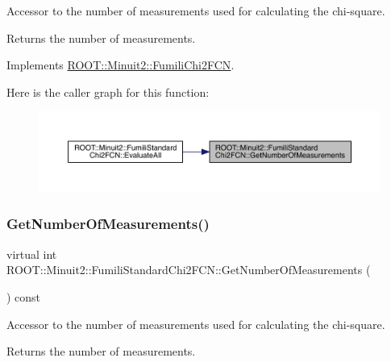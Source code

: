 Accessor to the number of measurements used for calculating the chi-\/square.

\begin{DoxyReturn}{Returns}
the number of measurements. 
\end{DoxyReturn}


Implements \mbox{\hyperlink{classROOT_1_1Minuit2_1_1FumiliChi2FCN_afa1acb8484d1c1825de0dd641e301717}{R\+O\+O\+T\+::\+Minuit2\+::\+Fumili\+Chi2\+F\+CN}}.

Here is the caller graph for this function\+:
\nopagebreak
\begin{figure}[H]
\begin{center}
\leavevmode
\includegraphics[width=350pt]{d8/db2/classROOT_1_1Minuit2_1_1FumiliStandardChi2FCN_a27414beb35c9c18156e6b3781aaf587f_icgraph}
\end{center}
\end{figure}
\mbox{\label{classROOT_1_1Minuit2_1_1FumiliStandardChi2FCN_a868b7c1aa7d2597db475ca99799c9131}} 
\subsubsection{\texorpdfstring{GetNumberOfMeasurements()}{GetNumberOfMeasurements()}\hspace{0.1cm}{\footnotesize\ttfamily [2/3]}}
{\footnotesize\ttfamily virtual int R\+O\+O\+T\+::\+Minuit2\+::\+Fumili\+Standard\+Chi2\+F\+C\+N\+::\+Get\+Number\+Of\+Measurements (\begin{DoxyParamCaption}{ }\end{DoxyParamCaption}) const\hspace{0.3cm}{\ttfamily [virtual]}}

Accessor to the number of measurements used for calculating the chi-\/square.

\begin{DoxyReturn}{Returns}
the number of measurements. 
\end{DoxyReturn}


